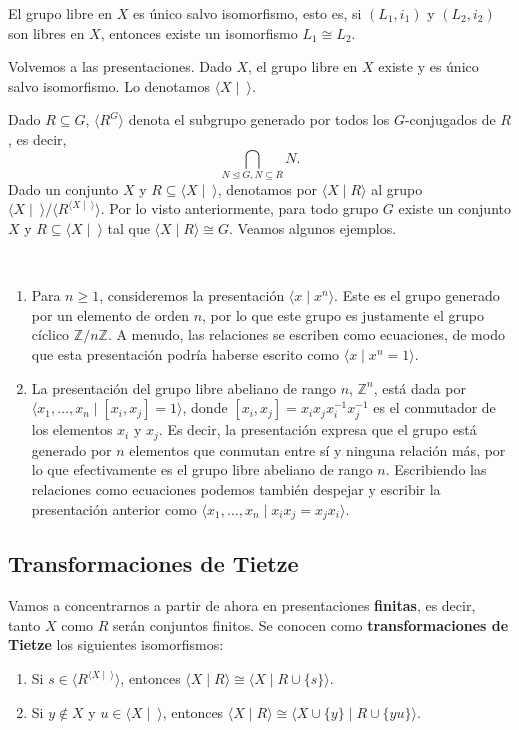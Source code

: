 \documentclass[bibtex, anon]{TEMat-article}
\newcommand{\Z}{\mathbb{Z}}
\providecommand{\gene}[1]{\langle{#1}\rangle}
\begin{document}
\begin{ejercicio}
	El grupo libre en $X$ es único salvo isomorfismo, esto es, si $(L_1,i_1)$ y $(L_2,i_2)$ son libres en $X$, entonces existe un isomorfismo $L_1\cong L_2$.
	\end{ejercicio}

Volvemos a las presentaciones. Dado $X$, el grupo libre en $X$ existe y es único salvo isomorfismo. Lo denotamos $\gene{X\mid\ }$. 

Dado $R\subseteq G$, $\gene{R^G}$ denota el subgrupo generado por todos los $G$-conjugados de $R$, es decir, $$\bigcap_{N\trianglelefteq G, N\subseteq R} N.$$
Dado un conjunto $X$ y $R\subseteq\gene{X\mid\ }$, denotamos por $\gene{X\mid R}$ al grupo $\gene{X\mid\ }/\gene{R^{\gene{X\mid\ }}}$. Por lo visto anteriormente, para todo grupo $G$ existe un conjunto $X$ y $R\subseteq\gene{X\mid\ }$ tal que $\gene{X\mid R}\cong G$. Veamos algunos ejemplos. 

\begin{ejemplo}\
	\begin{enumerate}[label=\roman*]
		\item Para $n\geq 1$, consideremos la presentación $\gene{x\mid x^n}$. Este es el grupo generado por un elemento de orden $n$, por lo que este grupo es justamente el grupo cíclico $\Z/n\Z$. A menudo, las relaciones se escriben como ecuaciones, de modo que esta presentación podría haberse escrito como $\gene{x\mid x^n=1}$. 
	\item  La presentación del grupo libre abeliano de rango $n$, $\Z^n$, está dada por $\gene{x_1,\dots, x_n\mid [x_i,x_j]=1}$, donde $[x_i,x_j]=x_ix_jx_i^{-1}x_j^{-1}$ es el conmutador de los elementos $x_i$ y $x_j$. Es decir, la presentación expresa que el grupo está generado por $n$ elementos que conmutan entre sí y ninguna relación más, por lo que efectivamente es el grupo libre abeliano de rango $n$. Escribiendo las relaciones como ecuaciones podemos también despejar y escribir la presentación anterior como $\gene{x_1,\dots, x_n\mid x_ix_j=x_jx_i}$. 
	\end{enumerate}
	\end{ejemplo}

\subsection{Transformaciones de Tietze}

Vamos a concentrarnos a partir de ahora en presentaciones \textbf{finitas}, es decir, tanto $X$ como $R$ serán conjuntos finitos. Se conocen como \textbf{transformaciones de Tietze} los siguientes isomorfismos:
\begin{enumerate}
	\item Si $s\in \gene{R^{\gene{X\mid\ }}}$, entonces $\gene{X\mid R}\cong\gene{X\mid R\cup\{s\}}$.
	\item Si $y\notin X$ y $u\in\gene{X\mid\ }$, entonces $\gene{X\mid R}\cong \gene{X\cup \{y\}\mid R\cup \{yu\}}$.
\end{enumerate}
\end{document}
